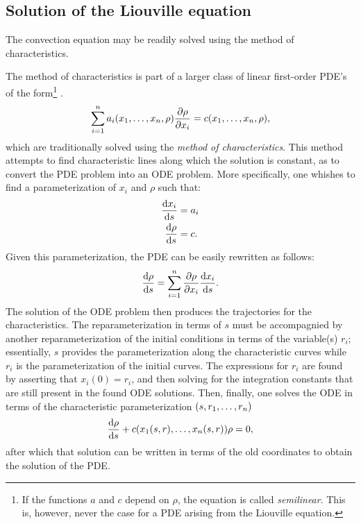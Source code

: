 \subsection{Solution of the Liouville equation}
The convection equation may be readily solved using the method of characteristics.
\begin{aside}{The method of characteristics}
     is part of a larger class of linear first-order PDE's of the form\footnote{If the functions $a$ and $c$ depend on $\rho$, the equation is called \emph{semilinear}. This is, however, never the case for a PDE arising from the Liouville equation.} \cite[p. 207]{Farlow1989}. \begin{equation} \sum_{i=1}^n a_i(x_1, \ldots, x_n, \rho) \pdv{\rho}{x_i} = c(x_1, \ldots, x_n, \rho), \label{eq:fo_pde}\end{equation}
    which are traditionally solved using the \emph{method of characteristics}. This method attempts to find characteristic lines along which the solution is constant, as to convert the PDE problem into an ODE problem. More specifically, one whishes to find a parameterization of $x_i$ and $\rho$ such that:
    \begin{equation}
        \begin{split}
            \dv{x_i}{s} &= a_i\\
            \dv{\rho}{s} &= c.
        \end{split}
    \end{equation}
    Given this parameterization, the PDE can be easily rewritten as follows: \cite{Farlow1989}
    $$ \dv{\rho}{s} = \sum_{i = 1}^n \pdv{\rho}{x_i}\dv{x_i}{s}. $$
    The solution of the ODE problem then produces the trajectories for the characteristics. The reparameterization in terms of $s$ must be accompagnied by another reparameterization of the initial conditions in terms of the variable(s) $r_i$; essentially, $s$ provides the parameterization along the characteristic curves while $r_i$ is the parameterization of the initial curves. The expressions for $r_i$ are found by asserting that $x_i(0) = r_i$, and then solving for the integration constants that are still present in the found ODE solutions. Then, finally, one solves the ODE in terms of the characteristic parameterization $\qty(s, r_1, \ldots, r_n)$
    $$ \dv{\rho}{s} + c\qty(x_1(s, r), \ldots, x_n(s, r))\rho = 0, $$
    after which that solution can be written in terms of the old coordinates to obtain the solution of the PDE.
    \tcblower

\end{aside}
